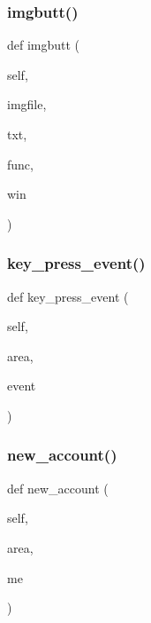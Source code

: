 \subsubsection{\texorpdfstring{imgbutt()}{imgbutt()}}
{\footnotesize\ttfamily def imgbutt (\begin{DoxyParamCaption}\item[{}]{self,  }\item[{}]{imgfile,  }\item[{}]{txt,  }\item[{}]{func,  }\item[{}]{win }\end{DoxyParamCaption})}

\mbox{\label{classdibagui_1_1_main_win_a7bb32848df24886f6972b780116052d2}} 
\subsubsection{\texorpdfstring{key\+\_\+press\+\_\+event()}{key\_press\_event()}}
{\footnotesize\ttfamily def key\+\_\+press\+\_\+event (\begin{DoxyParamCaption}\item[{}]{self,  }\item[{}]{area,  }\item[{}]{event }\end{DoxyParamCaption})}

\mbox{\label{classdibagui_1_1_main_win_ae455d2242af7dfc4e37c5db6f35e95fe}} 
\subsubsection{\texorpdfstring{new\+\_\+account()}{new\_account()}}
{\footnotesize\ttfamily def new\+\_\+account (\begin{DoxyParamCaption}\item[{}]{self,  }\item[{}]{area,  }\item[{}]{me }\end{DoxyParamCaption})}

